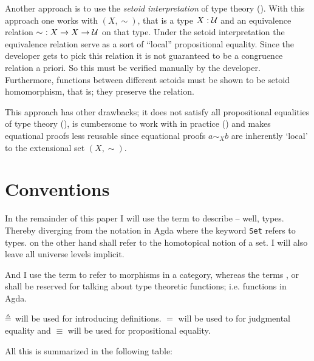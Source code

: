 Another approach is to use the \emph{setoid interpretation} of type
theory (\cite{hofmann-1995,huber-2016}). With this approach one works
with
 $(X, \sim)$, that is a type $X \mathrel{:} \mathcal{U}$
and an equivalence relation $\sim\ \mathrel{:} X \to X \to \mathcal{U}$ on that type.
Under the setoid interpretation the equivalence relation serve as a
sort of ``local'' propositional equality. Since the developer gets to
pick this relation it is not guaranteed to be a congruence relation
a priori. So this must be verified manually by the developer.
Furthermore, functions between different setoids must be shown to be
setoid homomorphism, that is; they preserve the relation.

This approach has other drawbacks; it does not satisfy
all propositional equalities of type theory (), is
cumbersome to work with in practice (\cite[p. 4]{huber-2016}) and makes
equational proofs less reusable since equational proofs $a \sim_{X} b$ are
inherently `local' to the extensional set $(X , \sim)$.

\section{Conventions}

In the remainder of this paper I will use the term
 to describe --
well, types. Thereby diverging from the notation in Agda where the keyword
\texttt{Set} refers to types.
 on the other hand shall refer to the
homotopical notion of a set. I will also leave all universe levels implicit.

And I use the term
 to refer to morphisms in a category,
whereas the terms
,
 or
shall be reserved for talking about type theoretic functions; i.e.
functions in Agda.

$\mathrel{\triangleq}$ will be used for introducing definitions. $=$ will be used to for
judgmental equality and $\equiv$ will be used for propositional equality.

All this is summarized in the following table:

